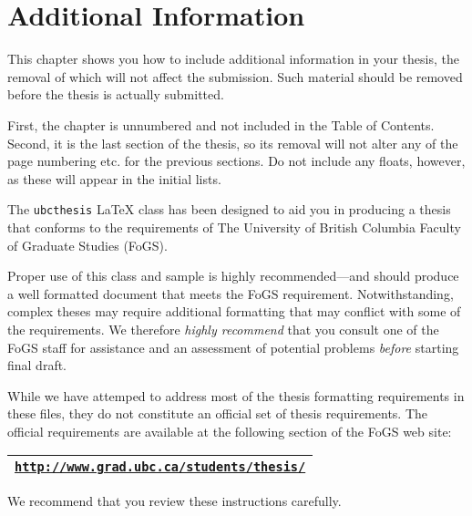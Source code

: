 \chapter*{Additional Information}
This chapter shows you how to include additional information in your
thesis, the removal of which will not affect the submission.  Such
material should be removed before the thesis is actually submitted.

First, the chapter is unnumbered and not included in the Table of
Contents.  Second, it is the last section of the thesis, so its
removal will not alter any of the page numbering etc. for the previous
sections.  Do not include any floats, however, as these will appear in
the initial lists.

The \texttt{ubcthesis} \LaTeX{} class has been designed to aid you in
producing a thesis that conforms to the requirements of The
University of British Columbia Faculty of Graduate Studies (FoGS).

Proper use of this class and sample is highly recommended---and should
produce a well formatted document that meets the FoGS requirement.
Notwithstanding, complex theses may require additional formatting that
may conflict with some of the requirements.  We therefore \emph{highly
  recommend} that you consult one of the FoGS staff for assistance and
an assessment of potential problems \emph{before} starting final
draft.

While we have attemped to address most of the thesis formatting
requirements in these files, they do not constitute an official set of
thesis requirements.  The official requirements are available at the
following section of the FoGS web site:
\begin{center}
  \begin{tabular}{|l|}
    \hline
    \href{http://www.grad.ubc.ca/students/thesis/}
    {\texttt{http://www.grad.ubc.ca/students/thesis/}}\\
    \hline
  \end{tabular}
\end{center}
We recommend that you review these instructions carefully.